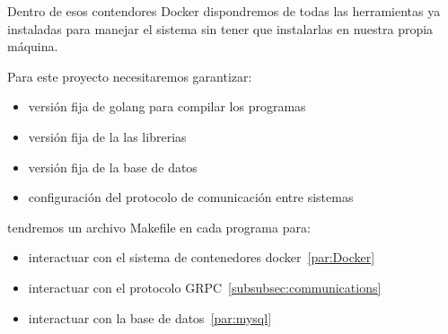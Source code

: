 Dentro de esos contendores Docker dispondremos de todas las herramientas ya instaladas para manejar el sistema sin tener que instalarlas en nuestra propia máquina.

Para este proyecto necesitaremos garantizar:

\begin{itemize}
    \item versión fija de golang para compilar los programas
    \item versión fija de la las librerias
    \item versión fija de la base de datos
    \item configuración del protocolo de comunicación entre sistemas
\end{itemize}

tendremos un archivo Makefile en cada programa para:

\begin{itemize}
    \item interactuar con el sistema de contenedores docker~\cref{par:Docker}
    \item interactuar con el protocolo GRPC~\cref{subsubsec:communications}
    \item interactuar con la base de datos~\cref{par:mysql}
\end{itemize}



